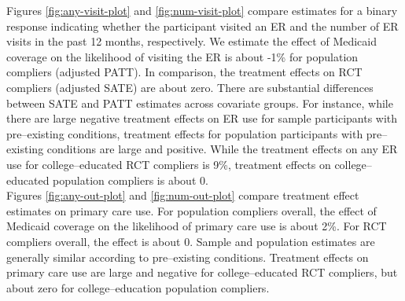 \documentclass[12pt]{article}
\begin{document}
Figures \ref{fig:any-visit-plot} and \ref{fig:num-visit-plot} compare estimates for a binary response indicating whether the participant visited an ER and the number of ER visits in the past 12 months, respectively. We estimate the effect of Medicaid coverage on the likelihood of visiting the ER is about -1\% for population compliers (adjusted PATT). In comparison, the treatment effects on RCT compliers (adjusted SATE) are about zero. There are substantial differences between SATE and PATT estimates across covariate groups. For instance, while there are large negative treatment effects on ER use for sample participants with pre--existing conditions, treatment effects for population participants with pre--existing conditions are large and positive. While the treatment effects on any ER use for college--educated RCT compliers is 9\%, treatment effects on college--educated population compliers is about 0. \\

Figures \ref{fig:any-out-plot} and \ref{fig:num-out-plot} compare treatment effect estimates on primary care use. For population compliers overall, the effect of Medicaid coverage on the likelihood of primary care use is about 2\%. For RCT compliers overall, the effect is about 0. Sample and population estimates are generally similar according to pre--existing conditions. Treatment effects on primary care use are large and negative for college--educated RCT compliers, but about zero for college--education population compliers. 
\end{document}

